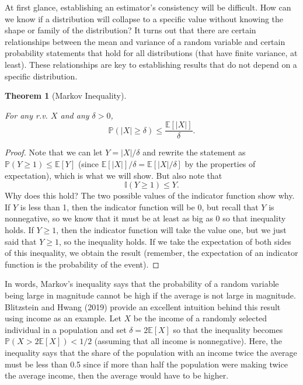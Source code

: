 \documentclass[
  letterpaper,
  DIV=11,
  numbers=noendperiod]{scrreprt}
\newcommand{\E}{\mathbb{E}}
\renewcommand{\P}{\mathbb{P}}
\theoremstyle{plain}
\newtheorem{theorem}{Theorem}[chapter]
\theoremstyle{definition}
\theoremstyle{definition}
\theoremstyle{remark}
\begin{document}
At first glance, establishing an estimator's consistency will be
difficult. How can we know if a distribution will collapse to a specific
value without knowing the shape or family of the distribution? It turns
out that there are certain relationships between the mean and variance
of a random variable and certain probability statements that hold for
all distributions (that have finite variance, at least). These
relationships are key to establishing results that do not depend on a
specific distribution.

\begin{theorem}[Markov
Inequality]\protect\hypertarget{thm-markov}{}\label{thm-markov}

For any r.v. \(X\) and any \(\delta >0\), \[
\P(|X| \geq \delta) \leq \frac{\E[|X|]}{\delta}.
\]

\end{theorem}

\begin{proof}

Note that we can let \(Y = |X|/\delta\) and rewrite the statement as
\(\P(Y \geq 1) \leq \E[Y]\) (since \(\E[|X|]/\delta = \E[|X|/\delta]\)
by the properties of expectation), which is what we will show. But also
note that \[
\mathbb{I}(Y \geq 1) \leq Y.
\] Why does this hold? The two possible values of the indicator function
show why. If \(Y\) is less than 1, then the indicator function will be
0, but recall that \(Y\) is nonnegative, so we know that it must be at
least as big as 0 so that inequality holds. If \(Y \geq 1\), then the
indicator function will take the value one, but we just said that
\(Y \geq 1\), so the inequality holds. If we take the expectation of
both sides of this inequality, we obtain the result (remember, the
expectation of an indicator function is the probability of the event).

\end{proof}

In words, Markov's inequality says that the probability of a random
variable being large in magnitude cannot be high if the average is not
large in magnitude. Blitzstein and Hwang (2019) provide an excellent
intuition behind this result using income as an example. Let \(X\) be
the income of a randomly selected individual in a population and set
\(\delta = 2\E[X]\) so that the inequality becomes
\(\P(X > 2\E[X]) < 1/2\) (assuming that all income is nonnegative).
Here, the inequality says that the share of the population with an
income twice the average must be less than 0.5 since if more than half
the population were making twice the average income, then the average
would have to be higher.
\end{document}
